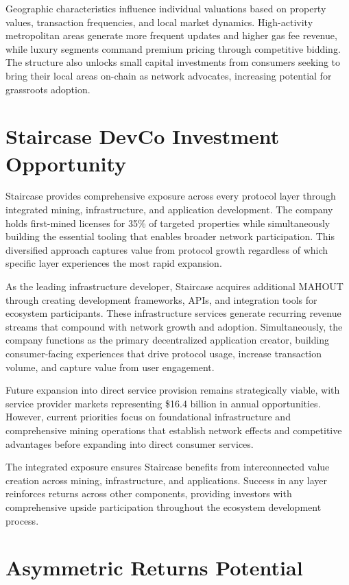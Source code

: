 Geographic characteristics influence individual valuations based on property values, transaction frequencies, and local market dynamics. High-activity metropolitan areas generate more frequent updates and higher gas fee revenue, while luxury segments command premium pricing through competitive bidding. The structure also unlocks small capital investments from consumers seeking to bring their local areas on-chain as network advocates, increasing potential for grassroots adoption.

\section{Staircase DevCo Investment Opportunity}

Staircase provides comprehensive exposure across every protocol layer through integrated mining, infrastructure, and application development. The company holds first-mined licenses for 35\% of targeted properties while simultaneously building the essential tooling that enables broader network participation. This diversified approach captures value from protocol growth regardless of which specific layer experiences the most rapid expansion.

As the leading infrastructure developer, Staircase acquires additional MAHOUT through creating development frameworks, APIs, and integration tools for ecosystem participants. These infrastructure services generate recurring revenue streams that compound with network growth and adoption. Simultaneously, the company functions as the primary decentralized application creator, building consumer-facing experiences that drive protocol usage, increase transaction volume, and capture value from user engagement.

Future expansion into direct service provision remains strategically viable, with service provider markets representing \$16.4 billion in annual opportunities. However, current priorities focus on foundational infrastructure and comprehensive mining operations that establish network effects and competitive advantages before expanding into direct consumer services.

The integrated exposure ensures Staircase benefits from interconnected value creation across mining, infrastructure, and applications. Success in any layer reinforces returns across other components, providing investors with comprehensive upside participation throughout the ecosystem development process.

\section{Asymmetric Returns Potential}

